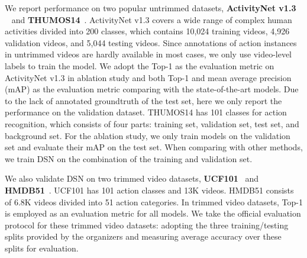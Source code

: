 \documentclass[journal]{IEEEtran}
\begin{document}
We report performance on two popular untrimmed datasets, \textbf{ActivityNet v1.3} ~\cite{anet} and \textbf{THUMOS14}~\cite{THUMOS14}.
ActivityNet v1.3 covers a wide range of complex human activities divided into 200 classes, which contains 10,024 training videos, 4,926 validation videos, and 5,044 testing videos.
Since annotations of action instances in untrimmed videos are hardly available in most cases, we only use video-level labels to train the model.
We adopt the Top-1 as the evaluation metric on ActivityNet v1.3 in ablation study and both Top-1 and mean average precision (mAP) as the evaluation metric comparing with the state-of-the-art models.
Due to the lack of annotated groundtruth of the test set, here we only report the performance on the validation dataset.
THUMOS14 has 101 classes for action recognition, which consists of four parts: training set, validation set, test set, and background set.
For the ablation study, we only train models on the validation set and evaluate their mAP on the test set. When comparing with other methods, we train DSN on the combination of the training and validation set.


We also validate DSN on two trimmed video datasets, \textbf{UCF101}~\cite{abs-1212-0402} and \textbf{HMDB51}~\cite{KuehneJGPS11}.
UCF101 has 101 action classes and 13K videos.
HMDB51 consists of 6.8K videos divided into 51 action categories. In trimmed video datasets, Top-1 is employed as an evaluation metric for all models.
We take the official evaluation protocol for these trimmed video datasets: adopting the three training/testing splits provided by the organizers and measuring average accuracy over these splits for evaluation.
\end{document}
